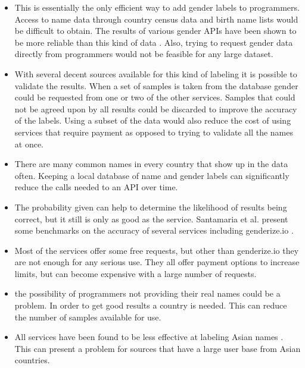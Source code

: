 \documentclass{article}
\begin{document}
\begin{itemize}
    \item \begin{sloppypar} This is essentially the only efficient way to add gender labels to programmers. Access to name data through country census data and birth name lists would be difficult to obtain. The results of various gender APIs have been shown to be more reliable than this kind of data \cite{Santamaria2018}. Also, trying to request gender data directly from programmers would not be feasible for any large dataset.\end{sloppypar}
    
    \item With several decent sources available for this kind of labeling it is possible to validate the results. When a set of samples is taken from the database gender could be requested from one or two of the other services. Samples that could not be agreed upon by all results could be discarded to improve the accuracy of the labels. Using a subset of the data would also reduce the cost of using services that require payment as opposed to trying to validate all the names at once.
    
    \item There are many common names in every country that show up in the data often. Keeping a local database of name and gender labels can significantly reduce the calls needed to an API over time.

    \item The probability given can help to determine the likelihood of results being correct, but it still is only as good as the service. Santamaria et al. present some benchmarks on the accuracy of several services including genderize.io \cite{Santamaria2018}.

    \item Most of the services offer some free requests, but other than genderize.io they are not enough for any serious use. They all offer payment options to increase limits, but can become expensive with a large number of requests.

    \item the possibility of programmers not providing their real names could be a problem. In order to get good results a country is needed. This can reduce the number of samples available for use.

    \item \begin{sloppypar} All services have been found to be less effective at labeling Asian names \cite{Santamaria2018}. This can present a problem for sources that have a large user base from Asian countries.\end{sloppypar}


\end{itemize}
\end{document}
